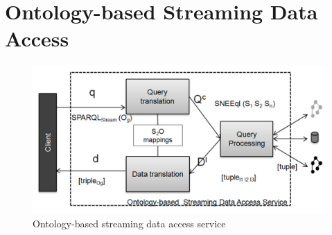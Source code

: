 \section{Ontology-based Streaming Data Access}
\label{approach}



\begin{figure}[t]
  \centering
  \includegraphics[width=.8\textwidth]{img/approachImg}
  \caption{Ontology-based streaming data access service} 
  \label{fig:SemanticIntegrator} 
\end{figure}


